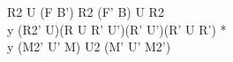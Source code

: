 R2 U (F B') R2 (F' B) U R2\\
y (R2' U)(R U R' U')(R' U')(R' U R') *\\
y (M2' U' M) U2 (M' U' M2')\\
